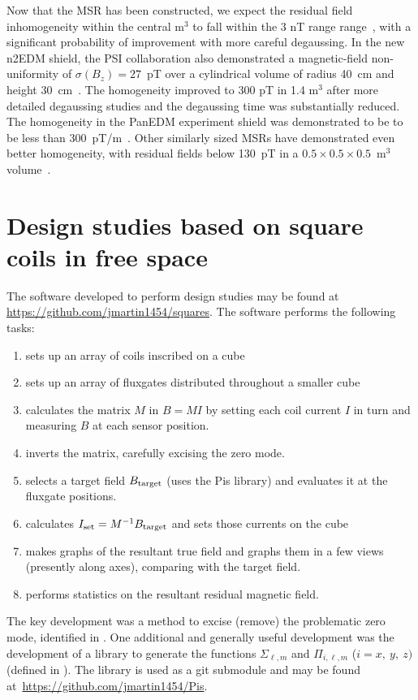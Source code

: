 \documentclass[preprint,12pt]{elsarticle}
\begin{document}
Now that the MSR has been constructed, we expect the residual field
inhomogeneity within the central m$^3$ to fall within the 3 nT range
range~\cite{bib:msr_rsi}, with a significant probability of
improvement with more careful degaussing.  In the new n2EDM shield,
the PSI collaboration also demonstrated a magnetic-field
non-uniformity of $\sigma(B_z)=27$~pT over a cylindrical volume of
radius 40~cm and height 30~cm~\cite{bib:n2edm-uniformity2025}.  The
homogeneity improved to 300 pT in 1.4 m$^3$ after more detailed
degaussing studies \cite{bib:Segarra2024Degaussing} and the degaussing
time was substantially reduced.  The homogeneity in the PanEDM
experiment shield was demonstrated to be to be less than
300~pT/m~\cite{bib:Altarev2014MSR}.  Other similarly sized MSRs have
demonstrated even better homogeneity, with residual fields below
130~pT in a $0.5\times0.5\times0.5$~m$^3$
volume~\cite{bib:Sun2021Limits}.

\section{Design studies based on square coils in free space}

The software developed to perform design studies may be found at
\url{https://github.com/jmartin1454/squares}.  The software performs
the following tasks:
\begin{enumerate}
\item sets up an array of coils inscribed on a cube
\item sets up an array of fluxgates distributed throughout a smaller
  cube
\item calculates the matrix $M$ in $B=MI$ by setting each coil current
  $I$ in turn and measuring $B$ at each sensor position.
\item inverts the matrix, carefully excising the zero mode.
\item selects a target field $B_{\rm target}$ (uses the Pis library)
  and evaluates it at the fluxgate positions.
\item calculates $I_{\rm set}=M^{-1}B_{\rm target}$ and sets those
  currents on the cube
\item makes graphs of the resultant true field and graphs them in a
  few views (presently along axes), comparing with the target field.
\item performs statistics on the resultant residual magnetic field.
\end{enumerate}

The key development was a method to excise (remove) the problematic
zero mode, identified in \cite{bib:shomithesis}.  One additional and
generally useful development was the development of a library to
generate the functions $\Sigma_{\ell,m}$ and $\Pi_{i,\ell,m}$
($i=x,~y,~z)$ (defined in \cite{bib:psifields}).  The library is used
as a git submodule and may be found
at~\url{https://github.com/jmartin1454/Pis}.
\end{document}
